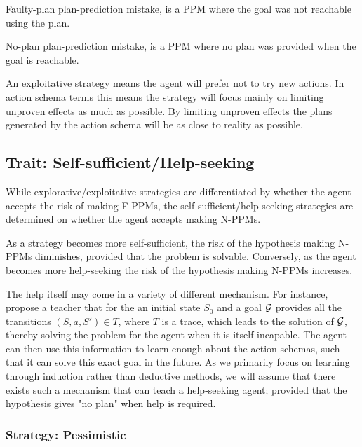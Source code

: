 \documentclass[\master/Master.tex]{subfiles}
\begin{document}
	\begin{definition} 
		[F-PPM] Faulty-plan plan-prediction mistake, is a PPM where the goal was not reachable using the plan.
	\end{definition}
	
	\begin{definition}
		[N-PPM] No-plan plan-prediction mistake, is a PPM where no plan was provided when the goal is reachable.
	\end{definition}
	An exploitative strategy means the agent will prefer not to try new actions.
	In action schema terms this means the strategy will focus mainly on limiting unproven effects as much as possible.
	By limiting unproven effects the plans generated by the action schema will be as close to reality as possible.

\subsection*{Trait: Self-sufficient/Help-seeking}

	While explorative/exploitative strategies are differentiated by whether the agent accepts the risk of making F-PPMs, the self-sufficient/help-seeking strategies are determined on whether the agent accepts making N-PPMs.

	As a strategy becomes more self-sufficient, the risk of the hypothesis making N-PPMs diminishes, provided that the problem is solvable.
	Conversely, as the agent becomes more help-seeking the risk of the hypothesis making N-PPMs increases.

	The help itself may come in a variety  of different mechanism.
	For instance, \cite{Walsh2008} propose a teacher that for the an initial state $S_0$ and a goal $\mathcal{G}$ provides all the transitions $(S,a,S') \in T$, where $T$ is a trace, which leads to the solution of $\mathcal{G}$,
	 thereby solving the problem for the agent when it is itself incapable.
	The agent can then use this information to learn enough about the action schemas, such that it can solve this exact goal in the future.
	As we primarily focus on learning through induction rather than deductive methods, we will assume that there exists such a mechanism that can teach a help-seeking agent;
	provided that the hypothesis gives "no plan" when help is required.

\subsubsection{Strategy: Pessimistic}
\end{document}
